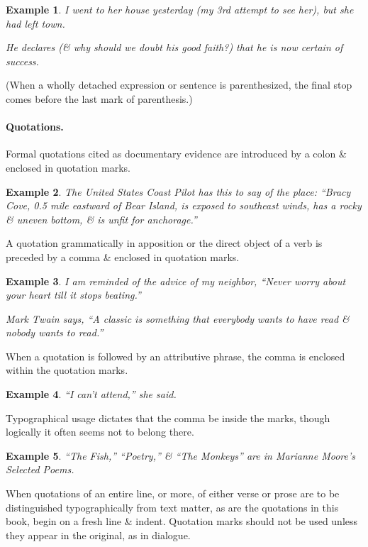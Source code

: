 \documentclass[oneside]{book}
\numberwithin{equation}{section}
\newtheorem{example}{Example}[chapter]
\begin{document}
\begin{example}
	I went to her house yesterday (my 3rd attempt to see her), but she had left town.
	
	He declares (\& why should we doubt his good faith?) that he is now certain of success.
\end{example}
(When a wholly detached expression or sentence is parenthesized, the final stop comes before the last mark of parenthesis.)

\paragraph*{Quotations.} Formal quotations cited as documentary evidence are introduced by a colon \& enclosed in quotation marks.

\begin{example}
	The United States Coast Pilot has this to say of the place: ``Bracy Cove, 0.5 mile eastward of Bear Island, is exposed to southeast winds, has a rocky \& uneven bottom, \& is unfit for anchorage.''
\end{example}
A quotation grammatically in apposition or the direct object of a verb is preceded by a comma \& enclosed in quotation marks.

\begin{example}
	I am reminded of the advice of my neighbor, ``Never worry about your heart till it stops beating.''
	
	Mark Twain says, ``A classic is something that everybody wants to have read \& nobody wants to read.''
\end{example}
When a quotation is followed by an attributive phrase, the comma is enclosed within the quotation marks.

\begin{example}
	``I can't attend,'' she said.
\end{example}
Typographical usage dictates that the comma be inside the marks, though logically it often seems not to belong there.

\begin{example}
	``The Fish,'' ``Poetry,'' \& ``The Monkeys'' are in Marianne Moore's Selected Poems.
\end{example}
When quotations of an entire line, or more, of either verse or prose are to be distinguished typographically from text matter, as are the quotations in this book, begin on a fresh line \& indent. Quotation marks should not be used unless they appear in the original, as in dialogue.
\end{document}
